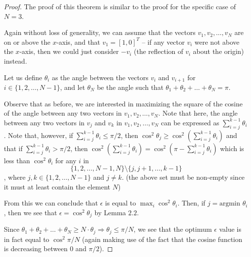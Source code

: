 \documentclass[11pt,letterpaper,twoside,english]{article}
\theoremstyle{theorem}
\theoremstyle{remark}
\begin{document}
\begin{proof}
The proof of this theorem is similar to the proof for the specific case of $N=3$.

Again without loss of generality, we can assume that the vectors $v_1, v_2, \ldots, v_N$ are on or above the $x$-axis, and that $v_1 = [1,0]^T$ -- if any vector $v_i$ were not above the $x$-axis, then we could just consider $-v_i$ (the reflection of $v_i$ about the origin) instead.

Let us define $\theta_i$ as the angle between the vectors $v_i$ and $v_{i+1}$ for $i \in \{1, 2, \ldots, N-1\}$, and let $\theta_N$ be the angle such that $\theta_1 + \theta_2 + \ldots + \theta_N = \pi$.

Observe that as before, we are interested in maximizing the square of the cosine of the angle between any two vectors in $v_1, v_2, \ldots, v_N$. Note that here, the angle between any two vectors in $v_j$ and $v_k$ in $v_1, v_2, \ldots, v_N$ can be expressed as $\sum_{i=j} ^{k-1} \theta_i$. Note that, however, if $\sum_{i=j}^{k-1} \theta_i \leq \pi/2$, then $\cos^2 \theta_j \geq \cos^2(\sum_{i=j}^{k-1} \theta_i)$ and that if $\sum_{i=j}^{k-1} \theta_i > \pi/2$, then $\cos^2 (\sum_{i=j}^{k-1} \theta_i) = \cos^2 (\pi - \sum_{i=j}^{k-1} \theta_i)$ which is less than $\cos^2 \theta_i$ for any $i$ in $$\{1, 2, \ldots, N-1, N\} \setminus \{j, j+1, \ldots, k-1\}$$, where $j, k \in \{1, 2, \ldots, N-1\}$ and $j \neq k$. (the above set must be non-empty since it must at least contain the element $N$)

From this we can conclude that $\epsilon$ is equal to $\max_i \cos^2 \theta_i$. Then, if $j = \text{argmin } \theta_i$, then we see that $\epsilon = \cos^2 \theta_j$ by Lemma $2.2$.

Since $\theta_ 1 + \theta_2 + \ldots + \theta_N \geq N \cdot \theta_j \Rightarrow \theta_j \leq \pi/N$, we see that the optimum $\epsilon$ value is in fact equal to $\cos^2 \pi/N$ (again making use of the fact that the cosine function is decreasing between $0$ and $\pi/2$).
\end{proof}
\end{document}
